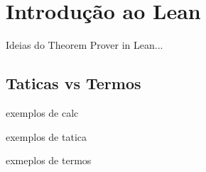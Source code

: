 \chapter{Introdução ao Lean}

Ideias do Theorem Prover in Lean...

\section{Taticas vs Termos}

exemplos de calc

exemplos de tatica

exmeplos de termos


